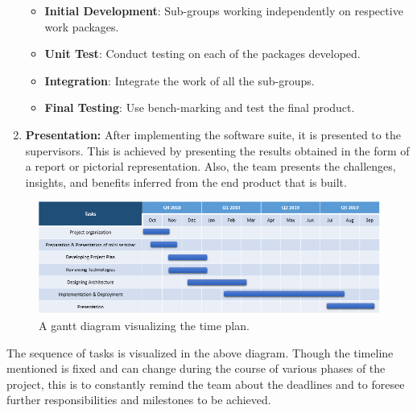 \begin{enumerate}
		\begin{itemize}
		\item\textbf{Initial Development}: Sub-groups working independently on respective work packages.
		\item\textbf{Unit Test}: Conduct testing on each of the packages developed.
		\item\textbf{Integration}: Integrate the work of all the sub-groups.
		\item\textbf{Final Testing}: Use bench-marking and test the final product. 	
	\end{itemize}


	\item \textbf{Presentation:}
	After implementing the software suite, it is presented to the supervisors. This is achieved by presenting the results obtained in the form of a report or pictorial representation. Also, the team presents the challenges, insights, and benefits inferred from the end product that is built. 
	\end{enumerate}

\begin{figure}[h]
\centering
\includegraphics[scale=.6]{timeplan}
\caption{A gantt diagram visualizing the time plan.}
\end{figure}
The sequence of tasks is visualized in the above diagram. Though the timeline mentioned is fixed and can change during the course of various phases of the project, this is to constantly remind the team about the deadlines and to foresee further responsibilities and milestones to be achieved. 


	